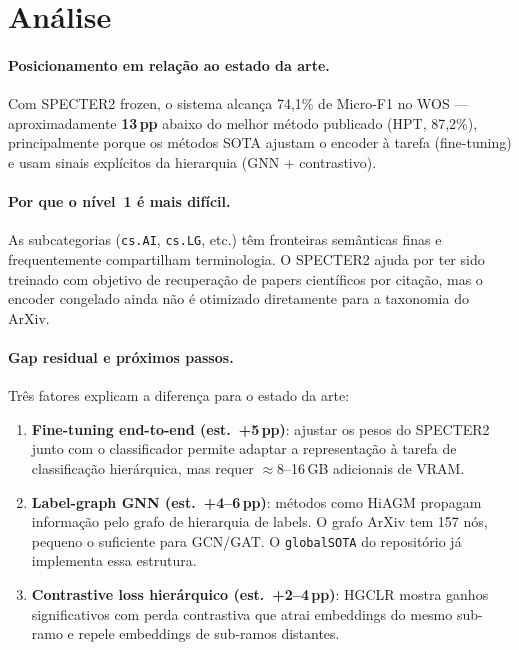 \documentclass[11pt,a4paper]{article}
\begin{document}
\section{Análise}

\paragraph{Posicionamento em relação ao estado da arte.}
Com SPECTER2 frozen, o sistema alcança 74,1\% de Micro-F1 no WOS ---
aproximadamente \textbf{13\,pp} abaixo do melhor método publicado (HPT, 87,2\%),
principalmente porque os métodos SOTA ajustam o encoder à tarefa (fine-tuning)
e usam sinais explícitos da hierarquia (GNN + contrastivo).

\paragraph{Por que o nível~1 é mais difícil.}
As subcategorias (\texttt{cs.AI}, \texttt{cs.LG}, etc.) têm fronteiras semânticas
finas e frequentemente compartilham terminologia. O SPECTER2 ajuda por ter sido
treinado com objetivo de recuperação de papers científicos por citação, mas o encoder
congelado ainda não é otimizado diretamente para a taxonomia do ArXiv.

\paragraph{Gap residual e próximos passos.}
Três fatores explicam a diferença para o estado da arte:
\begin{enumerate}
    \item \textbf{Fine-tuning end-to-end (est.\ +5\,pp)}: ajustar os pesos do SPECTER2
          junto com o classificador permite adaptar a representação à tarefa de
          classificação hierárquica, mas requer $\approx$8--16\,GB adicionais de VRAM.
    \item \textbf{Label-graph GNN (est.\ +4--6\,pp)}: métodos como HiAGM propagam
          informação pelo grafo de hierarquia de labels.
          O grafo ArXiv tem 157 nós, pequeno o suficiente para GCN/GAT.
          O \texttt{globalSOTA} do repositório já implementa essa estrutura.
    \item \textbf{Contrastive loss hierárquico (est.\ +2--4\,pp)}: HGCLR mostra ganhos
          significativos com perda contrastiva que atrai embeddings do mesmo sub-ramo e
          repele embeddings de sub-ramos distantes.
\end{enumerate}
\end{document}
